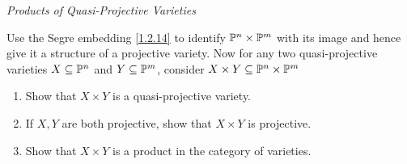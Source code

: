 \label{1.3.16}

\emph{Products of Quasi-Projective Varieties}

Use the Segre embedding \ref{1.2.14} to identify $\P^n \times \P^m$ with its image and hence give it a structure of a projective variety. Now for any two quasi-projective varieties $X \subseteq \P^n$ and $Y \subseteq \P^m$, consider $X \times Y \subseteq \P^n \times \P^m$

\begin{enumerate}[label = (\alph*)]
    \item Show that $X \times Y$ is a quasi-projective variety.

    \item If $X, Y$ are both projective, show that $X \times Y$ is projective.

    \item Show that $X \times Y$ is a product in the category of varieties.
\end{enumerate}

